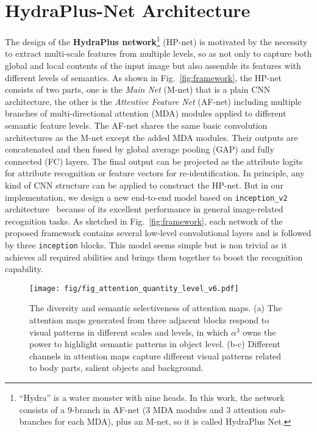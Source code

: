 \documentclass[10pt,twocolumn,letterpaper]{article}
\begin{document}
\section{HydraPlus-Net Architecture}
\label{sec:multi_attention}
\vspace{-0.1cm}
The design of the \textbf{HydraPlus network}\footnote{“Hydra” is a water monster with nine heads. In this work, the network consists of a 9-branch in AF-net (3 MDA modules and 3 attention sub-branches for each MDA), plus an M-net, so it is called HydraPlus Net.} (HP-net) is motivated by the necessity to extract multi-scale features from multiple levels, so as not only to capture both global and local contents of the input image but also assemble its features with different levels of semantics.
As shown in Fig.~\ref{fig:framework}, the HP-net consists of two parts, one is the \textit{Main Net} (M-net) that is a plain CNN architecture, the other is the \textit{Attentive Feature Net} (AF-net) including multiple branches of multi-directional attention (MDA) modules applied to different semantic feature levels.
The AF-net shares the same basic convolution architectures as the M-net except the added MDA modules.
Their outputs are concatenated and then fused by global average pooling (GAP) and fully connected (FC) layers. The final output can be projected as the attribute logits for attribute recognition or feature vectors for re-identification.
In principle, any kind of CNN structure can be applied to construct the HP-net.
But in our implementation, we design a new end-to-end model based on \texttt{inception\_v2} architecture~\cite{ioffe2015batch} because of its excellent performance in general image-related recognition tasks.
As sketched in Fig.~\ref{fig:framework}, each network of the proposed framework contains several low-level convolutional layers and is followed by three \texttt{inception} blocks.
This model seems simple but is non trivial as it achieves all required abilities and brings them together to boost the recognition capability.



\begin{figure}[t]
\centering
\texttt{[image: fig/fig\_attention\_quantity\_level\_v6.pdf]}
\caption{The diversity and semantic selectiveness of attention maps. (a) The attention maps generated from three adjacent blocks respond to visual patterns in different scales and levels, in which $\alpha^3$ owns the power to highlight semantic patterns in object level. (b-c) Different channels in attention maps capture different visual patterns related to body parts, salient objects and background.
}
\label{fig:attention_level}
\end{figure}
\end{document}
